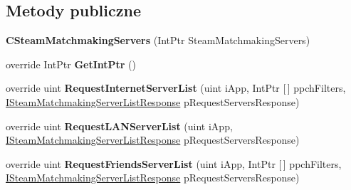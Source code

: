 \subsection*{Metody publiczne}
\begin{DoxyCompactItemize}
\item 
\mbox{\label{class_valve_1_1_steamworks_1_1_c_steam_matchmaking_servers_ac1ea0ed29903a32dc25797635ac0b31b}} 
{\bfseries C\+Steam\+Matchmaking\+Servers} (Int\+Ptr Steam\+Matchmaking\+Servers)
\item 
\mbox{\label{class_valve_1_1_steamworks_1_1_c_steam_matchmaking_servers_a2c15c3675ddf668f33d5fb7839b5105f}} 
override Int\+Ptr {\bfseries Get\+Int\+Ptr} ()
\item 
\mbox{\label{class_valve_1_1_steamworks_1_1_c_steam_matchmaking_servers_a497329267bb3d132e265a7cc33898e7c}} 
override uint {\bfseries Request\+Internet\+Server\+List} (uint i\+App, Int\+Ptr \mbox{[}$\,$\mbox{]} ppch\+Filters, \hyperlink{class_valve_1_1_steamworks_1_1_i_steam_matchmaking_server_list_response}{I\+Steam\+Matchmaking\+Server\+List\+Response} p\+Request\+Servers\+Response)
\item 
\mbox{\label{class_valve_1_1_steamworks_1_1_c_steam_matchmaking_servers_a1181bb73f46d56daa3b9dd31cd3c1385}} 
override uint {\bfseries Request\+L\+A\+N\+Server\+List} (uint i\+App, \hyperlink{class_valve_1_1_steamworks_1_1_i_steam_matchmaking_server_list_response}{I\+Steam\+Matchmaking\+Server\+List\+Response} p\+Request\+Servers\+Response)
\item 
\mbox{\label{class_valve_1_1_steamworks_1_1_c_steam_matchmaking_servers_a5aaf6fa95eba3d14aa2c7de49e6d7236}} 
override uint {\bfseries Request\+Friends\+Server\+List} (uint i\+App, Int\+Ptr \mbox{[}$\,$\mbox{]} ppch\+Filters, \hyperlink{class_valve_1_1_steamworks_1_1_i_steam_matchmaking_server_list_response}{I\+Steam\+Matchmaking\+Server\+List\+Response} p\+Request\+Servers\+Response)
\item 
\mbox{\label{class_valve_1_1_steamworks_1_1_c_steam_matchmaking_servers_a817adfa8f944d3c943fdf46bce642876}} 

\end{DoxyCompactItemize}
